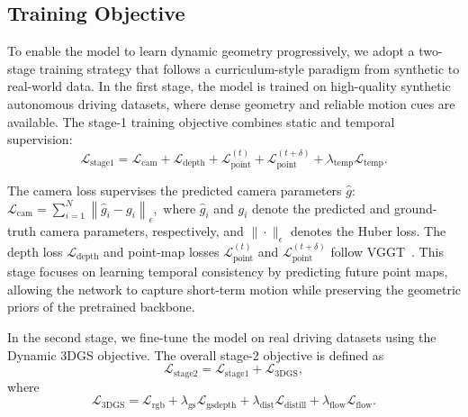 
\subsection{Training Objective}

To enable the model to learn dynamic geometry progressively, we adopt a two-stage training strategy that follows a curriculum-style paradigm from synthetic to real-world data. 
In the first stage, the model is trained on high-quality synthetic autonomous driving datasets, where dense geometry and reliable motion cues are available. 
The stage-1 training objective combines static and temporal supervision:
\begin{equation}
\mathcal{L}_{\mathrm{stage1}} =
\mathcal{L}_{\mathrm{cam}}
+ \mathcal{L}_{\mathrm{depth}}
+ \mathcal{L}_{\mathrm{point}}^{(t)}
+ \mathcal{L}_{\mathrm{point}}^{(t+\delta)}
+ \lambda_{\mathrm{temp}} \mathcal{L}_{\mathrm{temp}}.
\end{equation}

The camera loss supervises the predicted camera parameters $\hat{g}$:
$
\mathcal{L}_{\mathrm{cam}} = \sum_{i=1}^{N} \left\| \hat{g}_i - g_i \right\|_{\epsilon},
$
where $\hat{g}_i$ and $g_i$ denote the predicted and ground-truth camera parameters, respectively, and $\|\cdot\|_{\epsilon}$ denotes the Huber loss. 
The depth loss $\mathcal{L}_{\mathrm{depth}}$ and point-map losses $\mathcal{L}_{\mathrm{point}}^{(t)}$ and $\mathcal{L}_{\mathrm{point}}^{(t+\delta)}$ follow VGGT~\cite{wang2025vggt}. 
This stage focuses on learning temporal consistency by predicting future point maps, allowing the network to capture short-term motion while preserving the geometric priors of the pretrained backbone.

In the second stage, we fine-tune the model on real driving datasets using the Dynamic 3DGS objective. 
The overall stage-2 objective is defined as
\begin{equation}
\mathcal{L}_{\mathrm{stage2}} = \mathcal{L}_{\mathrm{stage1}} + \mathcal{L}_{\mathrm{3DGS}},
\end{equation}
where
\begin{equation}
\mathcal{L}_{\mathrm{3DGS}} =
\mathcal{L}_{\mathrm{rgb}}
+ \lambda_{\mathrm{gs}} \mathcal{L}_{\mathrm{gsdepth}}
+ \lambda_{\mathrm{dist}} \mathcal{L}_{\mathrm{distill}}
+ \lambda_{\mathrm{flow}} \mathcal{L}_{\mathrm{flow}}.
\end{equation}

